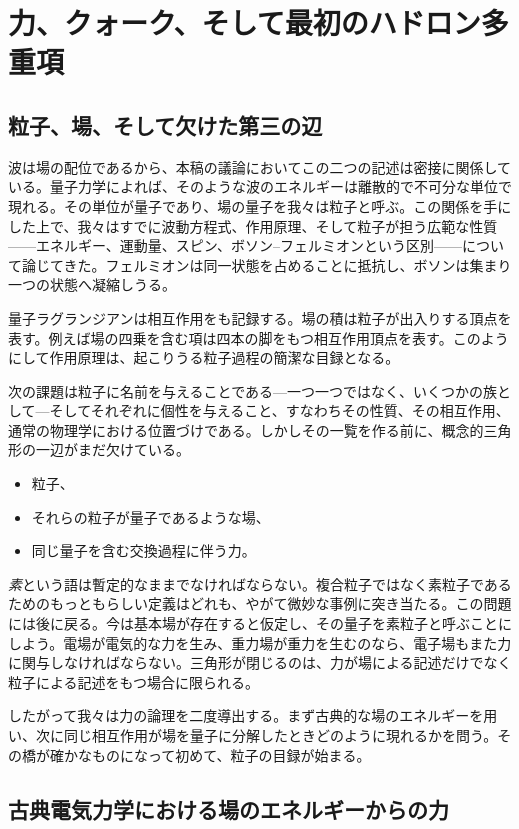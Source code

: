 \chapter{力、クォーク、そして最初のハドロン多重項}

\section{粒子、場、そして欠けた第三の辺}

波は場の配位であるから、本稿の議論においてこの二つの記述は密接に関係している。量子力学によれば、そのような波のエネルギーは離散的で不可分な単位で現れる。その単位が量子であり、場の量子を我々は粒子と呼ぶ。この関係を手にした上で、我々はすでに波動方程式、作用原理、そして粒子が担う広範な性質——エネルギー、運動量、スピン、ボソン--フェルミオンという区別——について論じてきた。フェルミオンは同一状態を占めることに抵抗し、ボソンは集まり一つの状態へ凝縮しうる。

量子ラグランジアンは相互作用をも記録する。場の積は粒子が出入りする頂点を表す。例えば場の四乗を含む項は四本の脚をもつ相互作用頂点を表す。このようにして作用原理は、起こりうる粒子過程の簡潔な目録となる。

次の課題は粒子に名前を与えることである---一つ一つではなく、いくつかの族として---そしてそれぞれに個性を与えること、すなわちその性質、その相互作用、通常の物理学における位置づけである。しかしその一覧を作る前に、概念的三角形の一辺がまだ欠けている。
\begin{itemize}
\item 粒子、
\item それらの粒子が量子であるような場、
\item 同じ量子を含む交換過程に伴う力。
\end{itemize}

\emph{素}という語は暫定的なままでなければならない。複合粒子ではなく素粒子であるためのもっともらしい定義はどれも、やがて微妙な事例に突き当たる。この問題には後に戻る。今は基本場が存在すると仮定し、その量子を素粒子と呼ぶことにしよう。電場が電気的な力を生み、重力場が重力を生むのなら、電子場もまた力に関与しなければならない。三角形が閉じるのは、力が場による記述だけでなく粒子による記述をもつ場合に限られる。

したがって我々は力の論理を二度導出する。まず古典的な場のエネルギーを用い、次に同じ相互作用が場を量子に分解したときどのように現れるかを問う。その橋が確かなものになって初めて、粒子の目録が始まる。

\section{古典電気力学における場のエネルギーからの力}

